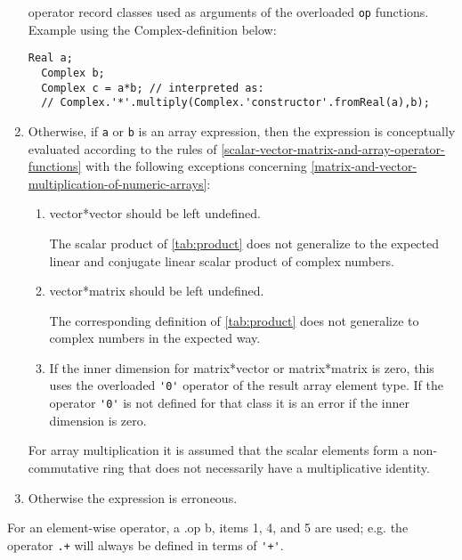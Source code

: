 \begin{enumerate}
\begin{nonnormative}
  operator record classes used as arguments of the overloaded \lstinline!op!
  functions. Example using the Complex-definition below:
\begin{lstlisting}[language=modelica]
   Real a;
  Complex b;
  Complex c = a*b; // interpreted as:
  // Complex.'*'.multiply(Complex.'constructor'.fromReal(a),b);
\end{lstlisting}
\end{nonnormative}
\item
  Otherwise, if \lstinline!a! or \lstinline!b! is an array expression, then the expression is
  conceptually evaluated according to the rules of \autoref{scalar-vector-matrix-and-array-operator-functions} with the
  following exceptions concerning \autoref{matrix-and-vector-multiplication-of-numeric-arrays}:
  \begin{enumerate}
  \def\labelenumii{(\alph{enumii})}
  \item
    vector*vector should be left undefined.
    \begin{nonnormative}
    The scalar product of \autoref{tab:product} does not generalize to the expected linear and conjugate linear scalar product of complex numbers.
    \end{nonnormative}
  \item
    vector*matrix should be left undefined.
    \begin{nonnormative}
    The corresponding definition of \autoref{tab:product} does not generalize to complex numbers in the expected way.
    \end{nonnormative}
  \item
    If the inner dimension for matrix*vector or matrix*matrix is zero,
    this uses the overloaded \lstinline!'0'! operator of the result array element
    type. If the operator \lstinline!'0'! is not defined for that class it is an
    error if the inner dimension is zero.
  \end{enumerate}

\begin{nonnormative}
For array multiplication it is assumed that the scalar elements
form a non-commutative ring that does not necessarily have a
multiplicative identity.
\end{nonnormative}

\item
  Otherwise the expression is erroneous.
\end{enumerate}

For an element-wise operator, a .op b, items 1, 4, and 5 are used; e.g.
the operator \lstinline!.+! will always be defined in terms of \lstinline!'+'!.

